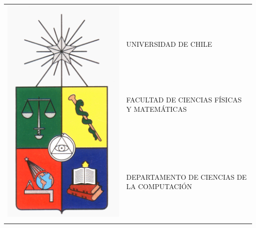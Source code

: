 \documentclass[11pt,oneside,letterpaper,leqno]{report}
\newcommand{\dpto}{DEPARTAMENTO DE CIENCIAS DE LA COMPUTACIÓN}
\newcommand{\Dpto}{\MakeUppercase{\dpto}}
\begin{document}
\newpage
\thispagestyle{empty}
\begin{center}

\begin{tabular}{rl}
\multirow{5}{*}{\includegraphics[scale=0.1]{Figuras/escudoU.png}} &\\
& \\
& UNIVERSIDAD DE CHILE\\
& FACULTAD DE CIENCIAS FÍSICAS Y MATEMÁTICAS\\
& \Dpto\\
& \\
\end{tabular}


\end{center}
\end{document}
